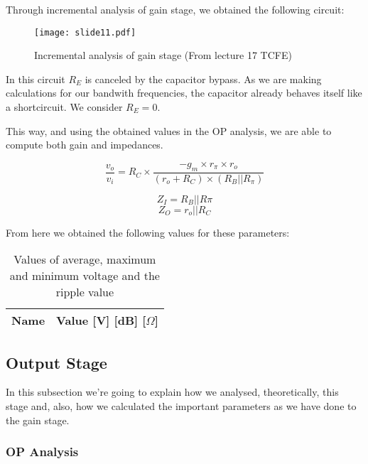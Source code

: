 Through incremental analysis of gain stage, we obtained the following circuit:

\begin{figure}[H] \centering
\texttt{[image: slide11.pdf]}
\caption{Incremental analysis of gain stage (From lecture 17 TCFE)}
\label{fig:rc2s}
\end{figure} 

In this circuit $R_E$ is canceled by the capacitor bypass. As we are making calculations for our bandwith frequencies, the capacitor already behaves itself like a shortcircuit. We consider $R_E = 0$.

This way, and using the obtained values in the OP analysis, we are able to compute both gain and impedances. 


\begin{equation}
\frac{v_o}{v_i} = R_C \times\frac{-g_m \times r_\pi \times r_o}{(r_o + R_C) \times (R_B || R_\pi)}
\end{equation}

\begin{equation}
   Z_I = R_B || R\pi 
\end{equation}
\begin{equation}
   Z_O = r_o || R_C
\end{equation}

From here we obtained the following values for these parameters:

\vspace{0.3in}
\begin{table}[ht]
  \centering
  \begin{tabular}{|l|r|}
    \hline    
    {\bf Name} & {\bf Value [V] [dB] [$\Omega$]} \\ \hline
    
  \end{tabular}
  \caption{Values of average, maximum and minimum voltage and the ripple value}
  \label{tab:op1s}
\end{table}

\subsection{Output Stage}

In this subsection we're going to explain how we analysed, theoretically, this stage and, also, how we calculated the important parameters as we have done to the gain stage.

\subsubsection{OP Analysis}



